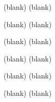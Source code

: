 \documentclass[avery5371,grid,frame]{flashcards}
\begin{document}
\begin{flashcard}[Twierdzenie]{(blank)}
(blank)
\end{flashcard}
\begin{flashcard}[Twierdzenie]{(blank)}
(blank)
\end{flashcard}
\begin{flashcard}[Twierdzenie]{(blank)}
(blank)
\end{flashcard}
\begin{flashcard}[Twierdzenie]{(blank)}
(blank)
\end{flashcard}
\begin{flashcard}[Twierdzenie]{(blank)}
(blank)
\end{flashcard}
\begin{flashcard}[Twierdzenie]{(blank)}
(blank)
\end{flashcard}
\end{document}
